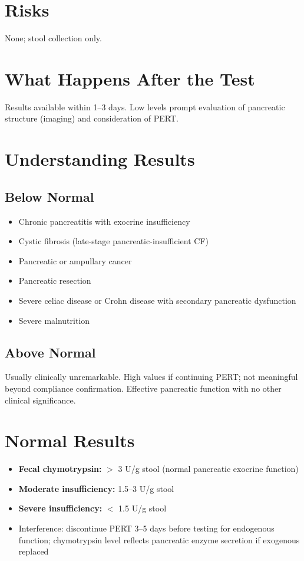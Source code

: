 \section*{Risks}
None; stool collection only.

\section*{What Happens After the Test}
Results available within 1--3 days. Low levels prompt evaluation of pancreatic structure (imaging) and consideration of PERT.

\section*{Understanding Results}

\subsection*{Below Normal}
\begin{itemize}
  \item Chronic pancreatitis with exocrine insufficiency
  \item Cystic fibrosis (late-stage pancreatic-insufficient CF)
  \item Pancreatic or ampullary cancer
  \item Pancreatic resection
  \item Severe celiac disease or Crohn disease with secondary pancreatic dysfunction
  \item Severe malnutrition
\end{itemize}

\subsection*{Above Normal}
Usually clinically unremarkable. High values if continuing PERT; not meaningful beyond compliance confirmation. Effective pancreatic function with no other clinical significance.

\section*{Normal Results}
\begin{itemize}
  \item \textbf{Fecal chymotrypsin:} $>$ 3 U/g stool (normal pancreatic exocrine function)
  \item \textbf{Moderate insufficiency:} 1.5--3 U/g stool
  \item \textbf{Severe insufficiency:} $<$ 1.5 U/g stool
  \item Interference: discontinue PERT 3--5 days before testing for endogenous function; chymotrypsin level reflects pancreatic enzyme secretion if exogenous replaced
\end{itemize}

